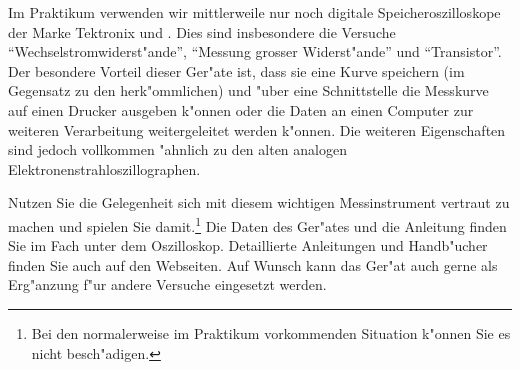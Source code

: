 %


Im Praktikum verwenden wir mittlerweile nur noch digitale
Speicheroszilloskope der Marke Tektronix  und
. Dies sind insbesondere die Versuche
"`Wechselstromwiderst"ande"', "`Messung grosser Widerst"ande"' und
"`Transistor"'. Der besondere Vorteil dieser Ger"ate ist, dass sie
eine Kurve speichern (im Gegensatz zu den herk"ommlichen) und "uber
eine Schnittstelle die Messkurve auf einen Drucker ausgeben k"onnen
oder die Daten an einen Computer zur weiteren Verarbeitung
weitergeleitet werden k"onnen. Die weiteren Eigenschaften sind jedoch
vollkommen "ahnlich zu den alten analogen
Elektronenstrahloszillographen.

Nutzen Sie die Gelegenheit sich mit diesem wichtigen Messinstrument
vertraut zu machen und spielen Sie damit.\footnote{Bei den
normalerweise im Praktikum vorkommenden Situation k"onnen Sie es
nicht besch"adigen.} Die Daten des Ger"ates und die Anleitung finden
Sie im Fach unter dem Oszilloskop. Detaillierte Anleitungen und
Handb"ucher finden Sie auch auf den Webseiten. Auf Wunsch kann das
Ger"at auch gerne als Erg"anzung f"ur andere Versuche eingesetzt
werden.

